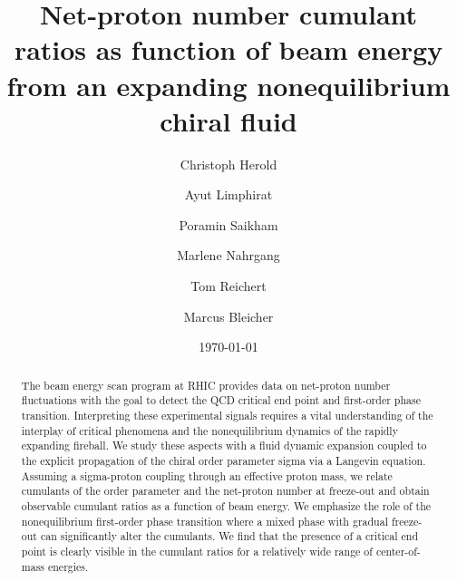 \documentclass[%
 reprint,
 amsmath,amssymb,
 aps,
]{revtex4-2}
\begin{document}

\title{Net-proton number cumulant ratios as function of beam energy from an expanding nonequilibrium chiral fluid}%

\author{Christoph Herold}
\author{Ayut Limphirat}
\author{Poramin Saikham}

\author{Marlene Nahrgang}

\author{Tom Reichert}
\author{Marcus Bleicher}

\date{\today}%

\begin{abstract}
The beam energy scan program at RHIC provides data on net-proton number fluctuations with the goal to detect the QCD critical end point and first-order phase transition. Interpreting these experimental signals requires a vital understanding of the interplay of critical phenomena and the nonequilibrium dynamics of the rapidly expanding fireball. We study these aspects with a fluid dynamic expansion coupled to the explicit propagation of the chiral order parameter sigma via a Langevin equation. Assuming a sigma-proton coupling through an effective proton mass, we relate cumulants of the order parameter and the net-proton number at freeze-out and obtain observable cumulant ratios as a function of beam energy. We emphasize the role of the nonequilibrium first-order phase transition where a mixed phase with gradual freeze-out can significantly alter the cumulants. We find that the presence of a critical end point is clearly visible in the cumulant ratios for a relatively wide range of center-of-mass energies. 
\end{abstract}
\end{document}
